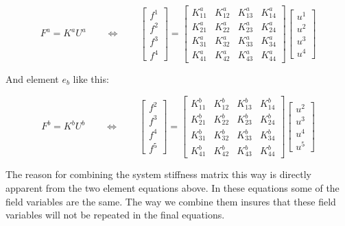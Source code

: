 \begin{equation}
\label{eq:matrix-equation-for-element-a}
F^a = K^a U^a
\qquad \Leftrightarrow \qquad
\begin{bmatrix}
f^1 \\
f^2 \\
f^3 \\
f^4
\end{bmatrix}
=
\begin{bmatrix}
K^a_{11} & K^a_{12} & K^a_{13} & K^a_{14} \\
K^a_{21} & K^a_{22} & K^a_{23} & K^a_{24} \\
K^a_{31} & K^a_{32} & K^a_{33} & K^a_{34} \\
K^a_{41} & K^a_{42} & K^a_{43} & K^a_{44}
\end{bmatrix}
\begin{bmatrix}
u^1 \\
u^2 \\
u^3 \\
u^4
\end{bmatrix}
\end{equation}

And element $e_b$ like this:

\begin{equation}
F^b = K^b U^b
\qquad \Leftrightarrow \qquad
\begin{bmatrix}
f^2 \\
f^3 \\
f^4 \\
f^5
\end{bmatrix}
=
\begin{bmatrix}
K^b_{11} & K^b_{12} & K^b_{13} & K^b_{14} \\
K^b_{21} & K^b_{22} & K^b_{23} & K^b_{24} \\
K^b_{31} & K^b_{32} & K^b_{33} & K^b_{34} \\
K^b_{41} & K^b_{42} & K^b_{43} & K^b_{44}
\end{bmatrix}
\begin{bmatrix}
u^2 \\
u^3 \\
u^4 \\
u^5
\end{bmatrix}
\end{equation}

The reason for combining the system stiffness matrix this way is
directly apparent from the two element equations above. In these
equations some of the field variables are the same. The way we
combine them insures that these field variables will not be repeated
in the final equations. \newline

